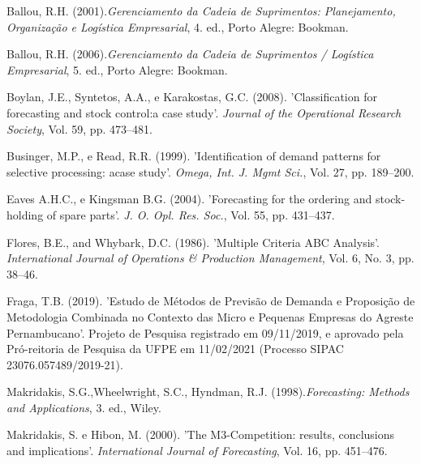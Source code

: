 \documentclass{book}
\begin{document}
\begin{thebibliography}{12}

Ballou, R.H. (2001).{\it Gerenciamento da Cadeia de Suprimentos: Planejamento, Organização e Logística Empresarial}, 4. ed., Porto Alegre: Bookman.

Ballou, R.H. (2006).{\it Gerenciamento da Cadeia de Suprimentos / Logística Empresarial}, 5. ed., Porto Alegre: Bookman.

Boylan, J.E., Syntetos, A.A., e Karakostas, G.C. (2008). 'Classification for forecasting and stock control:a case study'. {\it Journal of the Operational Research Society}, Vol. 59, pp. 473--481.

Businger, M.P., e Read, R.R. (1999). 'Identification of demand patterns for selective processing: acase study'. {\it Omega, Int. J. Mgmt Sci.}, Vol. 27, pp. 189--200.

Eaves A.H.C., e Kingsman B.G. (2004). 'Forecasting for the ordering and stock-holding of spare parts'. {\it J. O. Opl. Res. Soc.}, Vol. 55, pp. 431--437.

Flores, B.E., and Whybark, D.C. (1986). 'Multiple Criteria ABC Analysis'. {\it International Journal of Operations \& Production Management}, Vol. 6, No. 3, pp. 38--46.

Fraga, T.B. (2019). 'Estudo de Métodos de Previsão de Demanda e Proposição de Metodologia Combinada no Contexto das Micro e Pequenas Empresas do Agreste Pernambucano'. Projeto de Pesquisa registrado em 09/11/2019, e aprovado pela Pró-reitoria de Pesquisa da UFPE em 11/02/2021 (Processo SIPAC 23076.057489/2019-21).

Makridakis, S.G.,Wheelwright, S.C., Hyndman, R.J. (1998).{\it Forecasting: Methods and Applications}, 3. ed., Wiley.

Makridakis, S. e Hibon, M. (2000). 'The M3-Competition: results, conclusions and implications'. {\it International Journal of Forecasting}, Vol. 16, pp. 451--476.


\end{thebibliography}
\end{document}
